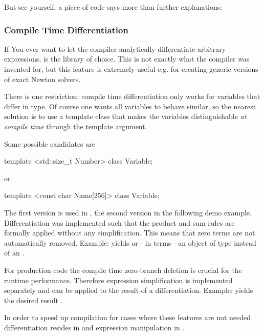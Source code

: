 But see yourself: a piece of code says more than further explanations:



\subsubsection{Compile Time Differentiation}

If You ever want to let the compiler analytically differentiate arbitrary
expressions, \Daixtrose is the library of choice. This is not exactly what the
compiler was invented for, but this feature is extremely useful e.g. for
creating generic versions of exact Newton solvers.

There is one restriction: compile time differentiation only works for
variables that differ in type. Of course one wants all variables to behave
similar, so the nearest solution is to use a template class that makes
the variables distinguishable \emph{at compile time} through the template
argument.

Some possible candidates are
\begin{code}
  template <std::size_t Number> class Variable;
\end{code}
%
or
\begin{code}
  template <const char Name[256]> class Variable;
\end{code}

The first version is used in , the
second version in the following demo example. Differentiation was implemented
such that the product and sum rules are formally applied without any
simplification. This means that zero terms are not automatically removed.
Example:  yields  or - in \CC terms - an
object of type  instead of an
.

For production code the compile time zero-branch deletion is crucial for the
runtime performance. Therefore expression simplification is implemented
separately and can be applied to the result of a differentiation.  
Example:  yields the desired result .

In order to speed up compilation for cases where these features are not needed
differentiation resides in  and expression
manipulation in . 

